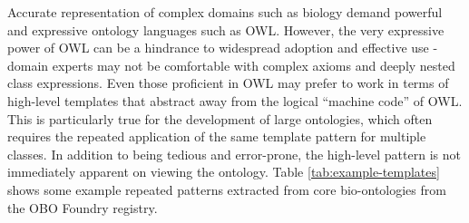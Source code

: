 \documentclass{llncs}
\begin{document}

Accurate representation of complex domains such as biology demand
powerful and expressive ontology languages such as OWL. However, the
very expressive power of OWL can be a hindrance to widespread adoption
and effective use - domain experts may not be comfortable with complex
axioms and deeply nested class expressions. Even those proficient in
OWL may prefer to work in terms of high-level templates that abstract
away from the logical ``machine code'' of OWL. This is particularly
true for the development of large ontologies, which often requires the
repeated application of the same template pattern for multiple
classes. In addition to being tedious and error-prone, the high-level
pattern is not immediately apparent on viewing the ontology. Table
\ref{tab:example-templates} shows some example repeated patterns
extracted from core bio-ontologies from the OBO Foundry
registry\cite{Smith2007}.
\end{document}
